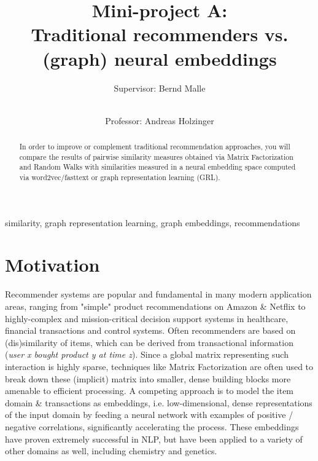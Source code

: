 \documentclass[review]{elsarticle}
\begin{document}
\begin{frontmatter}

\title{Mini-project A: \\ Traditional recommenders vs. (graph) neural embeddings }

\author[TUG,MUG]{Supervisor: Bernd Malle}
\author[TUG,MUG]{\small \\Professor: Andreas Holzinger}

\address[TUG]{Graz University of Technology, Austria}
\address[MUG]{Medical University Graz, Austria}


\begin{abstract}

In order to improve or complement traditional recommendation approaches, you will compare the results of pairwise similarity measures obtained via Matrix Factorization and Random Walks with similarities measured in a neural embedding space computed via word2vec/fasttext or graph representation learning (GRL).

\end{abstract}

\begin{keyword}
similarity, graph representation learning, graph embeddings, recommendations
\end{keyword}

\end{frontmatter}


\section{Motivation}
\label{sect:motivation}

Recommender systems are popular and fundamental in many modern application areas, ranging from "simple" product recommendations on Amazon \& Netflix to highly-complex and mission-critical decision support systems in healthcare, financial transactions and control systems. Often recommenders are based on (dis)similarity of items, which can be derived from transactional information (\textit{user x bought product y at time z}). Since a global matrix representing such interaction is highly sparse, techniques like Matrix Factorization are often used to break down these (implicit) matrix into smaller, dense building blocks more amenable to efficient processing. A competing approach is to model the item domain \& transactions as embeddings, i.e. low-dimensional, dense representations of the input domain by feeding a neural network with examples of positive / negative correlations, significantly accelerating the process. These embeddings have proven extremely successful in NLP, but have been applied to a variety of other domains as well, including chemistry and genetics.
\end{document}
